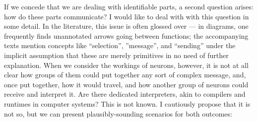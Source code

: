 If we concede that we are dealing with identifiable parts, a second question arises: how do these parts communicate? I would like to deal with with this question in some detail. In the literature, this issue is often glossed over --- in diagrams, one frequently finds unannotated arrows going between functions; the accompanying texts mention concepts like ``selection'', ''message'', and ``sending'' under the implicit assumption that these are merely primitives in no need of further explanation. When we consider the workings of neurons, however, it is not at all clear how groups of them could put together any sort of complex message, and, once put together, how it would travel, and how another group of neurons could receive and interpret it. Are there dedicated interpreters, akin to compilers and runtimes in computer systems? This is not known. I cautiously propose that it is not so, but we can present plausibly-sounding scenarios for both outcomes:
